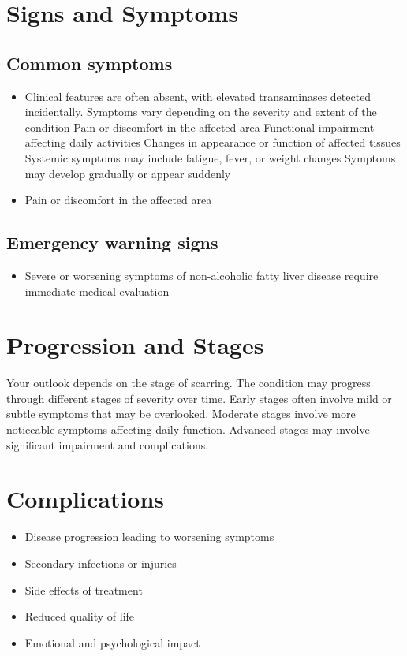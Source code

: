 \section{Signs and Symptoms}

\subsection{Common symptoms}
\begin{itemize}[noitemsep]
  \item Clinical features are often absent, with elevated transaminases detected incidentally. Symptoms vary depending on the severity and extent of the condition Pain or discomfort in the affected area Functional impairment affecting daily activities Changes in appearance or function of affected tissues Systemic symptoms may include fatigue, fever, or weight changes Symptoms may develop gradually or appear suddenly
  \item Pain or discomfort in the affected area
  \end{itemize}

\subsection{Emergency warning signs}
\begin{itemize}[noitemsep]
  \item Severe or worsening symptoms of non-alcoholic fatty liver disease require immediate medical evaluation
\end{itemize}
\section{Progression and Stages}
Your outlook depends on the stage of scarring. The condition may progress through different stages of severity over time. Early stages often involve mild or subtle symptoms that may be overlooked. Moderate stages involve more noticeable symptoms affecting daily function. Advanced stages may involve significant impairment and complications.
\section{Complications}
\begin{itemize}[noitemsep]
  \item Disease progression leading to worsening symptoms
  \item Secondary infections or injuries
  \item Side effects of treatment
  \item Reduced quality of life
  \item Emotional and psychological impact
\end{itemize}

